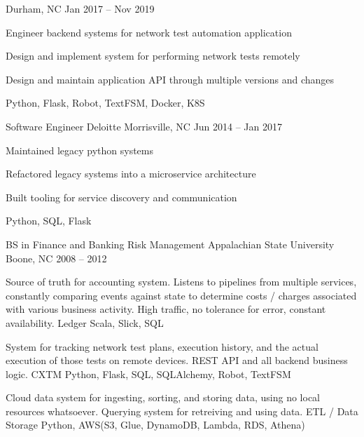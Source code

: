 \documentclass[]{awesome-cv}
\begin{document}
\begin{cventries}
	{Durham, NC}
	{Jan 2017 – Nov 2019}
	{\begin{cvitems}
		\item {Engineer backend systems for network test automation application}
		\item {Design and implement system for performing network tests remotely}
		\item {Design and maintain application API through multiple versions and changes}
		\item {Python, Flask, Robot, TextFSM, Docker, K8S}
		\end{cvitems}}
	\cventry
	{Software Engineer}
	{Deloitte}
	{Morrisville, NC}
	{Jun 2014 – Jan 2017}
	{\begin{cvitems}
		\item {Maintained legacy python systems}
		\item {Refactored legacy systems into a microservice architecture}
		\item {Built tooling for service discovery and communication}
		\item {Python, SQL, Flask}
		\end{cvitems}}
\end{cventries}
\begin{cventries}
	\cventry
	{BS in Finance and Banking \textbar{} Risk Management}
	{Appalachian State University}
	{Boone, NC}
	{2008 – 2012}
	{}
\end{cventries}

\vspace{-4mm}

\begin{cventries}
	\cventry
	{Source of truth for accounting system. Listens to pipelines from multiple services, constantly comparing events against state to determine costs / charges associated with various business activity. High traffic, no tolerance for error, constant availability.}
	{Ledger}
	{Scala, Slick, SQL}
	{}
	{}
	
	\vspace{-5mm}
	\cventry
	{System for tracking network test plans, execution history, and the actual execution of those tests on remote devices. REST API and all backend business logic.}
	{CXTM}
	{Python, Flask, SQL, SQLAlchemy, Robot, TextFSM}
	{}
	{}
	
	\vspace{-5mm}
	\cventry
	{Cloud data system for ingesting, sorting, and storing data, using no local resources whatsoever. Querying system for retreiving and using data.}
	{ETL / Data Storage}
	{Python, AWS(S3, Glue, DynamoDB, Lambda, RDS, Athena)}
	{}
	{}
	
\end{cventries}
\end{document}
